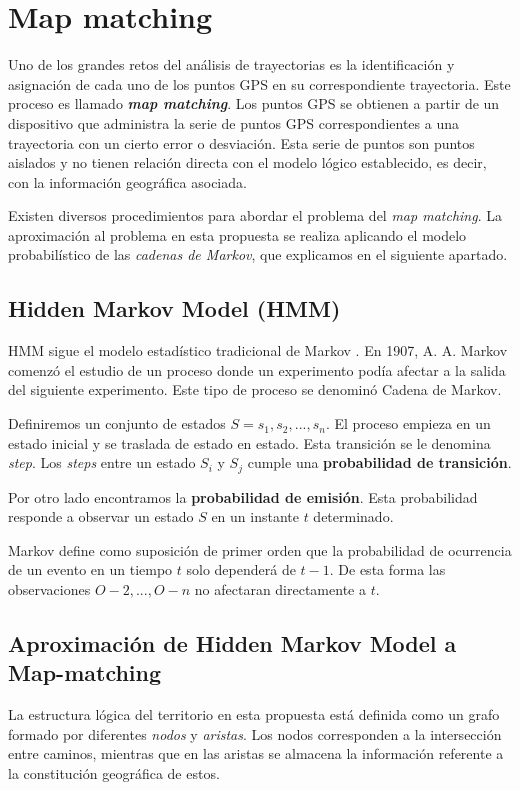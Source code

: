 \section{Map matching}\label{section: MapMatching}
Uno de los grandes retos del análisis de trayectorias es la identificación y asignación de 
cada uno de los puntos GPS en su correspondiente trayectoria. Este proceso es 
llamado \textbf{\textit{map matching}}. Los puntos GPS se obtienen a partir de un 
dispositivo que administra la serie de puntos GPS correspondientes a una trayectoria 
con un cierto error o desviación. Esta serie de puntos son puntos aislados y no tienen 
relación directa con el modelo lógico establecido, es decir, con la información 
geográfica asociada.

Existen diversos procedimientos para abordar el problema del \textit{map matching}. La 
aproximación al problema en esta propuesta se realiza aplicando el modelo 
probabilístico de las \textit{cadenas de Markov}, que explicamos en el siguiente 
apartado.

\subsection{Hidden Markov Model (\ac{HMM})}
\ac{HMM} sigue el modelo estadístico tradicional de Markov \cite{Malvar08}. En 1907, 
A. A. Markov comenzó el estudio de un proceso donde un experimento podía afectar a 
la salida del siguiente experimento. Este tipo de proceso se denominó Cadena de 
Markov. 

Definiremos un conjunto de estados $ S = {s_{1}, s_{2}, . . . , s_{n}}. $ El proceso 
empieza en un estado inicial y se traslada de estado en estado. Esta transición se le 
denomina \textit{step}. Los \textit{steps} entre un estado $S_{i}$  y $S_{j}$ cumple una 
\textbf{probabilidad de transición}.

Por otro lado encontramos la \textbf{probabilidad de emisión}. Esta probabilidad 
responde a observar un estado $S$ en un instante $t$ determinado.

Markov define como suposición de primer orden que la probabilidad de ocurrencia de 
un evento en un tiempo $t$ solo dependerá de $t-1$. De esta forma las observaciones 
${O-2,..., O-n}$ no afectaran directamente a $t$.

\subsection{Aproximación de Hidden Markov Model a Map-matching}
La estructura lógica del territorio en esta propuesta está definida como un grafo 
formado por diferentes \textit{nodos} y \textit{aristas}. Los nodos corresponden a la 
intersección entre caminos, mientras que en las aristas se almacena la información 
referente a la constitución geográfica de estos.

